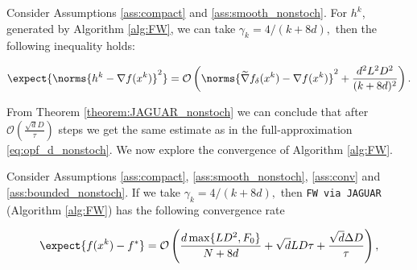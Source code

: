        \begin{theorem}
        \label{theorem:JAGUAR_nonstoch}
            Consider Assumptions \ref{ass:compact} and \ref{ass:smooth_nonstoch}. For $h^k$, generated by Algorithm \ref{alg:FW}, we can take
            $\gamma_k = 4/(k + 8d),$
            then the following inequality holds:


    
            \begin{equation*}
                \expect{\norms{h^k - \nabla f(x^k)}^2} = 
                \mathcal{O} \left( \norms{\widetilde{\nabla}f_{\delta}(x^k) - \nabla f(x^k)}^2
                +\frac{d^2 L^2 D^2}{(k + 8d)^2} \right).
            \end{equation*}
        \end{theorem}
        
        From Theorem \ref{theorem:JAGUAR_nonstoch} we can conclude that after $\mathcal{O}\left(\frac{\sqrt{d} D}{\tau}\right)$ steps we get the same estimate as in the full-approximation \eqref{eq:opf_d_nonstoch}. We now explore the convergence of Algorithm \ref{alg:FW}.

        \begin{theorem}
        \label{theorem:FW_nonstoch}
            Consider Assumptions \ref{ass:compact}, \ref{ass:smooth_nonstoch}, \ref{ass:conv} and \ref{ass:bounded_nonstoch}.
            If we take 
            $\gamma_k = 4/(k + 8d),$
            then \texttt{FW via JAGUAR} (Algorithm \ref{alg:FW}) has the following convergence rate

            \begin{equation*}
                \expect{f(x^{k}) - f^*}
                =
                \mathcal{O} \left( \frac{d \max\{L D^2, F_0 \}}{N + 8d}
                + \sqrt{d} L D \tau + \frac{\sqrt{d} \Delta D}{\tau}\right),
            \end{equation*}
        \end{theorem}



